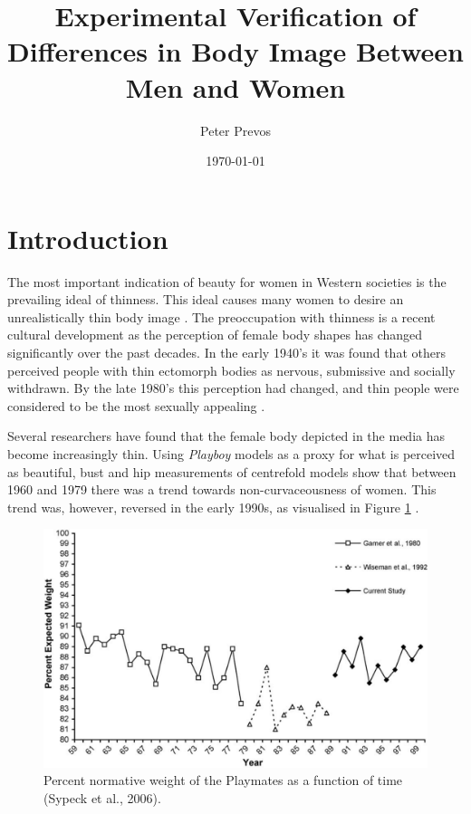 \documentclass[a4paper, apacite, jou, 11pt]{apa6}
\affiliation{Monash University}
\author{Peter Prevos}
\date{\today}
\title{Experimental Verification of Differences in Body Image Between Men and Women}
\begin{document}
\maketitle
\section{Introduction}
\label{sec:orge59e255}
The most important indication of beauty for women in Western societies is the prevailing ideal of thinness. This ideal causes many women to desire an unrealistically thin body image \cite{lamb_body_1993}. The preoccupation with thinness is a recent cultural development as the perception of female body shapes has changed significantly over the past decades. In the early 1940's it was found that others perceived people with thin ectomorph bodies as nervous, submissive and socially withdrawn. By the late 1980's this perception had changed, and thin people were considered to be the most sexually appealing \cite{turner_influence_1997}.

Several researchers have found that the female body depicted in the media has become increasingly thin. Using \emph{Playboy} models as a proxy for what is perceived as beautiful, bust and hip measurements of centrefold models show that between 1960 and 1979 there was a trend towards non-curvaceousness of women. This trend was, however, reversed in the early 1990s, as visualised in Figure \ref{playboy} \cite{garner_cultural_1980,turner_influence_1997,sypeck_cultural_2006,wiseman_cultural_1992}.

\begin{figure}[htbp]
\centering
\includegraphics[width=.9\linewidth]{playboy.png}
\caption{Percent normative weight of the Playmates as a function of time (Sypeck et al., 2006). \label{playboy}}
\end{figure}
\end{document}

